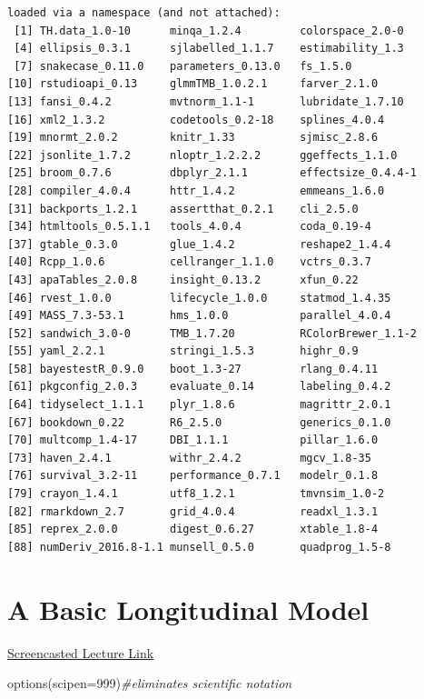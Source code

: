 \documentclass[
  english,
]{book}
\newenvironment{Shaded}{\begin{snugshade}}{\end{snugshade}}
\newcommand{\AttributeTok}[1]{\textcolor[rgb]{0.77,0.63,0.00}{#1}}
\newcommand{\CommentTok}[1]{\textcolor[rgb]{0.56,0.35,0.01}{\textit{#1}}}
\newcommand{\DecValTok}[1]{\textcolor[rgb]{0.00,0.00,0.81}{#1}}
\newcommand{\FunctionTok}[1]{\textcolor[rgb]{0.00,0.00,0.00}{#1}}
\newcommand{\NormalTok}[1]{#1}
\begin{document}
\begin{verbatim}
loaded via a namespace (and not attached):
 [1] TH.data_1.0-10      minqa_1.2.4         colorspace_2.0-0   
 [4] ellipsis_0.3.1      sjlabelled_1.1.7    estimability_1.3   
 [7] snakecase_0.11.0    parameters_0.13.0   fs_1.5.0           
[10] rstudioapi_0.13     glmmTMB_1.0.2.1     farver_2.1.0       
[13] fansi_0.4.2         mvtnorm_1.1-1       lubridate_1.7.10   
[16] xml2_1.3.2          codetools_0.2-18    splines_4.0.4      
[19] mnormt_2.0.2        knitr_1.33          sjmisc_2.8.6       
[22] jsonlite_1.7.2      nloptr_1.2.2.2      ggeffects_1.1.0    
[25] broom_0.7.6         dbplyr_2.1.1        effectsize_0.4.4-1 
[28] compiler_4.0.4      httr_1.4.2          emmeans_1.6.0      
[31] backports_1.2.1     assertthat_0.2.1    cli_2.5.0          
[34] htmltools_0.5.1.1   tools_4.0.4         coda_0.19-4        
[37] gtable_0.3.0        glue_1.4.2          reshape2_1.4.4     
[40] Rcpp_1.0.6          cellranger_1.1.0    vctrs_0.3.7        
[43] apaTables_2.0.8     insight_0.13.2      xfun_0.22          
[46] rvest_1.0.0         lifecycle_1.0.0     statmod_1.4.35     
[49] MASS_7.3-53.1       hms_1.0.0           parallel_4.0.4     
[52] sandwich_3.0-0      TMB_1.7.20          RColorBrewer_1.1-2 
[55] yaml_2.2.1          stringi_1.5.3       highr_0.9          
[58] bayestestR_0.9.0    boot_1.3-27         rlang_0.4.11       
[61] pkgconfig_2.0.3     evaluate_0.14       labeling_0.4.2     
[64] tidyselect_1.1.1    plyr_1.8.6          magrittr_2.0.1     
[67] bookdown_0.22       R6_2.5.0            generics_0.1.0     
[70] multcomp_1.4-17     DBI_1.1.1           pillar_1.6.0       
[73] haven_2.4.1         withr_2.4.2         mgcv_1.8-35        
[76] survival_3.2-11     performance_0.7.1   modelr_0.1.8       
[79] crayon_1.4.1        utf8_1.2.1          tmvnsim_1.0-2      
[82] rmarkdown_2.7       grid_4.0.4          readxl_1.3.1       
[85] reprex_2.0.0        digest_0.6.27       xtable_1.8-4       
[88] numDeriv_2016.8-1.1 munsell_0.5.0       quadprog_1.5-8     
\end{verbatim}

\hypertarget{LongMod}{%
\chapter{A Basic Longitudinal Model}\label{LongMod}}

\href{https://spu.hosted.panopto.com/Panopto/Pages/Viewer.aspx?pid=dedb85c8-e442-49bf-8f92-ad31018b1dd8}{Screencasted Lecture Link}

\begin{Shaded}
\begin{Highlighting}[]
\FunctionTok{options}\NormalTok{(}\AttributeTok{scipen=}\DecValTok{999}\NormalTok{)}\CommentTok{\#eliminates scientific notation}
\end{Highlighting}
\end{Shaded}
\end{document}
